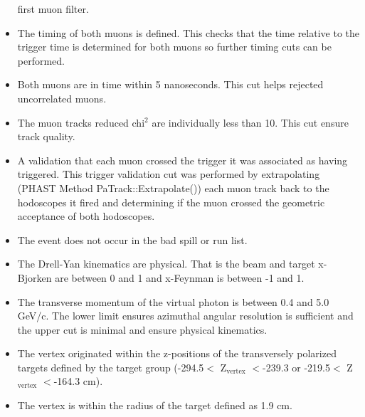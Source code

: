 \begin{itemize}
  first muon filter.
\item The timing of both muons is defined.  This checks that the time relative
  to the trigger time is determined for both muons so further timing cuts can be
  performed.
\item Both muons are in time within 5 nanoseconds.  This cut helps rejected
  uncorrelated muons.
\item The muon tracks reduced chi$^2$ are individually less than 10.  This cut
  ensure track quality.
\item A validation that each muon crossed the trigger it was associated as
  having triggered.  This trigger validation cut was performed by extrapolating
  (PHAST Method PaTrack::Extrapolate()) each muon track back to the hodoscopes
  it fired and determining if the muon crossed the geometric acceptance of both
  hodoscopes.
\item The event does not occur in the bad spill or run list.
\item The Drell-Yan kinematics are physical.  That is the beam and target
  x-Bjorken are between 0 and 1 and x-Feynman is between -1 and 1.
\item The transverse momentum of the virtual photon is between 0.4 and 5.0
  GeV/c.  The lower limit ensures azimuthal angular resolution is sufficient and
  the upper cut is minimal and ensure physical kinematics.
\item The vertex originated within the z-positions of the transversely polarized
  targets defined by the target group (-294.5$<$ Z$_{\mathrm{vertex}}$ $<$-239.3
  or -219.5$<$ Z$_{\mathrm{vertex}}$ $<$-164.3 cm).
\item The vertex is within the radius of the target defined as 1.9 cm.
\end{itemize}

